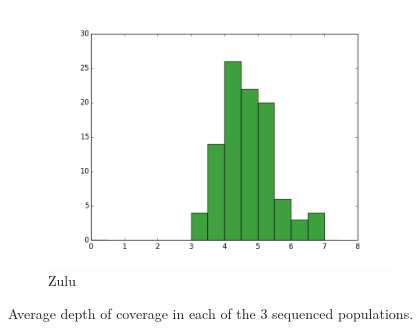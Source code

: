 \begin{figure}[htp]
\begin{subfigure}{.3\textwidth}
  \includegraphics[width=1.0\linewidth]{Chapter2/fig/coverage_zulu.png}
  \caption{Zulu}
\end{subfigure}
\caption{Average depth of coverage in each of the 3 sequenced populations.}
\label{fig:coverage}
\end{figure}